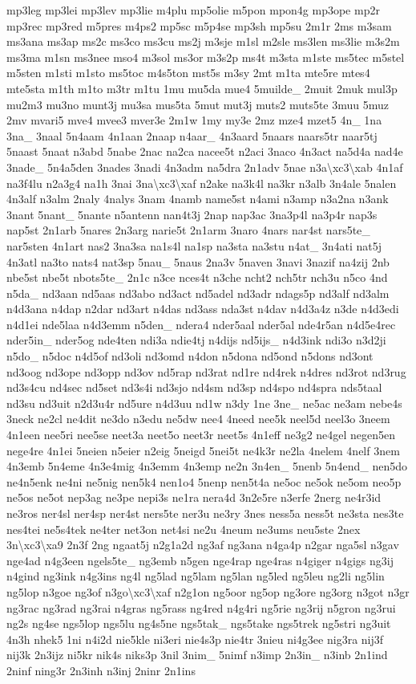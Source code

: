 {mp3leg mp3lei mp3lev mp3lie m4plu mp5olie m5pon mpon4g mp3ope mp2r mp3rec mp3red m5pres m4ps2 mp5sc m5p4se mp3sh mp5su 2m1r 2ms m3sam ms3ana ms3ap ms2c ms3co ms3cu ms2j m3sje m1sl m2sle ms3len ms3lie m3s2m ms3ma m1sn ms3nee mso4 m3sol ms3or m3s2p ms4t m3sta m1ste ms5tec m5stel m5sten m1sti m1sto ms5toc m4s5ton mst5s m3sy 2mt m1ta mte5re mtes4 mte5sta m1th m1to m3tr m1tu 1mu mu5da mue4 5muilde\-\_\- 2muit 2muk mul3p mu2m3 mu3no munt3j mu3sa mus5ta 5mut mut3j muts2 muts5te 3muu 5muz 2mv mvari5 mve4 mvee3 mver3e 2m1w 1my my3e 2mz mze4 mzet5 4n\-\_\- 1na 3na\-\_\- 3naal 5n4aam 4n1aan 2naap n4aar\-\_\- 4n3aard 5naars naars5tr naar5tj 5naast 5naat n3abd 5nabe 2nac na2ca nacee5t n2aci 3naco 4n3act na5d4a nad4e 3nade\-\_\- 5n4a5den 3nades 3nadi 4n3adm na5dra 2n1adv 5nae n3a\textbackslash{}xc3\textbackslash{}xab 4n1af na3f4lu n2a3g4 na1h 3nai 3na\textbackslash{}xc3\textbackslash{}xaf n2ake na3k4l na3kr n3alb 3n4ale 5nalen 4n3alf n3alm 2naly 4nalys 3nam 4namb name5st n4ami n3amp n3a2na n3ank 3nant 5nant\-\_\- 5nante n5antenn nan4t3j 2nap nap3ac 3na3p4l na3p4r nap3s nap5st 2n1arb 5nares 2n3arg narie5t 2n1arm 3naro 4nars nar4st nars5te\-\_\- nar5sten 4n1art nas2 3na3sa na1s4l na1sp na3sta na3stu n4at\-\_\- 3n4ati nat5j 4n3atl na3to nats4 nat3sp 5nau\-\_\- 5naus 2na3v 5naven 3navi 3nazif na4zij 2nb nbe5st nbe5t nbots5te\-\_\- 2n1c n3ce nces4t n3che ncht2 nch5tr nch3u n5co 4nd n5da\-\_\- nd3aan nd5aas nd3abo nd3act nd5adel nd3adr ndags5p nd3alf nd3alm n4d3ana n4dap n2dar nd3art n4das nd3ass nda3st n4dav n4d3a4z n3de n4d3edi n4d1ei nde5laa n4d3emm n5den\-\_\- ndera4 nder5aal nder5al nde4r5an n4d5e4rec nder5in\-\_\- nder5og nde4ten ndi3a ndie4tj n4dijs nd5ijs\-\_\- n4d3ink ndi3o n3d2ji n5do\-\_\- n5doc n4d5of nd3oli nd3omd n4don n5dona nd5ond n5dons nd3ont nd3oog nd3ope nd3opp nd3ov nd5rap nd3rat nd1re nd4rek n4dres nd3rot nd3rug nd3s4cu nd4sec nd5set nd3s4i nd3sjo nd4sm nd3sp nd4spo nd4spra nds5taal nd3su nd3uit n2d3u4r nd5ure n4d3uu nd1w n3dy 1ne 3ne\-\_\- ne5ac ne3am nebe4s 3neck ne2cl ne4dit ne3do n3edu ne5dw nee4 4need nee5k neel5d neel3o 3neem 4n1een nee5ri nee5se neet3a neet5o neet3r neet5s 4n1eff ne3g2 ne4gel negen5en nege4re 4n1ei 5neien n5eier n2eig 5neigd 5nei5t ne4k3r ne2la 4nelem 4nelf 3nem 4n3emb 5n4eme 4n3e4mig 4n3emm 4n3emp ne2n 3n4en\-\_\- 5nenb 5n4end\-\_\- nen5do ne4n5enk ne4ni ne5nig nen5k4 nen1o4 5nenp nen5t4a ne5oc ne5ok ne5om neo5p ne5os ne5ot nep3ag ne3pe nepi3s ne1ra nera4d 3n2e5re n3erfe 2nerg ne4r3id ne3ros ner4sl ner4sp ner4st ners5te ner3u ne3ry 3nes ness5a ness5t ne3sta nes3te nes4tei ne5s4tek ne4ter net3on net4si ne2u 4neum ne3ums neu5ste 2nex 3n\textbackslash{}xc3\textbackslash{}xa9 2n3f 2ng ngaat5j n2g1a2d ng3af ng3ana n4ga4p n2gar nga5sl n3gav nge4ad n4g3een ngels5te\-\_\- ng3emb n5gen nge4rap nge4ras n4giger n4gigs ng3ij n4gind ng3ink n4g3ins ng4l ng5lad ng5lam ng5lan ng5led ng5leu ng2li ng5lin ng5lop n3goe ng3of n3go\textbackslash{}xc3\textbackslash{}xaf n2g1on ng5oor ng5op ng3ore ng3org n3got n3gr ng3rac ng3rad ng3rai n4gras ng5rass ng4red n4g4ri ng5rie ng3rij n5gron ng3rui ng2s ng4se ngs5lop ngs5lu ng4s5ne ngs5tak\-\_\- ngs5take ngs5trek ng5stri ng3uit 4n3h nhek5 1ni n4i2d nie5kle ni3eri nie4s3p nie4tr 3nieu ni4g3ee nig3ra nij3f nij3k 2n3ijz ni5kr nik4s niks3p 3nil 3nim\-\_\- 5nimf n3imp 2n3in\-\_\- n3inb 2n1ind 2ninf ning3r 2n3inh n3inj 2ninr 2n1ins }
